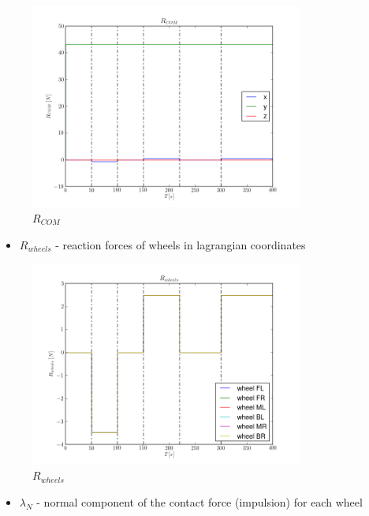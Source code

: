 \begin{figure}[H]
  \centering
    \includegraphics[width=0.8\textwidth]{pCOM3}
  \caption{$R_{COM}$}
\end{figure}

\begin{itemize}
  \item $R_{wheels}$ - reaction forces of wheels in lagrangian coordinates
\end{itemize}

\begin{figure}[H]
  \centering
    \includegraphics[width=0.8\textwidth]{pWHEELS3}
  \caption{$R_{wheels}$}
\end{figure}

\begin{itemize}
  \item $\lambda_{N}$ - normal component of the contact force (impulsion) for each wheel
\end{itemize}

